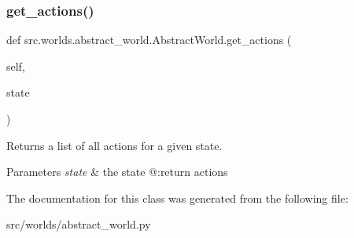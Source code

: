 \subsubsection{\texorpdfstring{get\+\_\+actions()}{get\_actions()}}
{\footnotesize\ttfamily def src.\+worlds.\+abstract\+\_\+world.\+Abstract\+World.\+get\+\_\+actions (\begin{DoxyParamCaption}\item[{}]{self,  }\item[{}]{state }\end{DoxyParamCaption})}



Returns a list of all actions for a given state. 


\begin{DoxyParams}{Parameters}
{\em state} & the state @\+:return actions \\
\hline
\end{DoxyParams}


The documentation for this class was generated from the following file\+:\begin{DoxyCompactItemize}
\item 
src/worlds/abstract\+\_\+world.\+py\end{DoxyCompactItemize}
